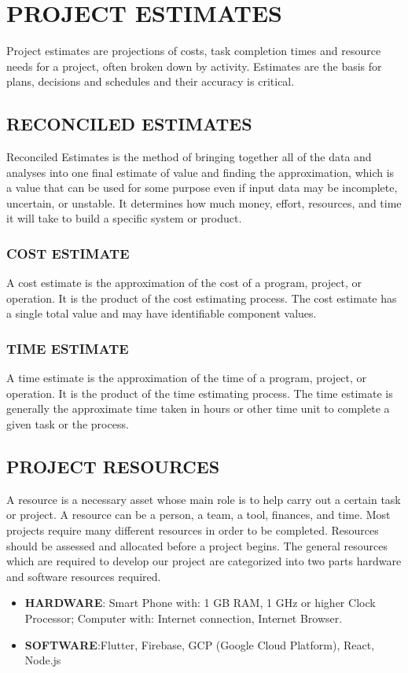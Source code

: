 \documentclass[12pt,a4paper]{report}
\begin{document}
\section{PROJECT ESTIMATES}
Project estimates are projections of costs, task completion times and resource needs for a project, often broken down by activity. Estimates are the basis for plans, decisions and schedules and their accuracy is critical.
\subsection{RECONCILED ESTIMATES}
Reconciled Estimates is the method of bringing together all of the data and analyses into one final estimate of value and finding the approximation, which is a value that can be used for some purpose even if input data may be incomplete, uncertain, or unstable. It determines how much money, effort, resources, and time it will take to build a specific system or product. 
\subsubsection{COST ESTIMATE}
A cost estimate is the approximation of the cost of a program, project, or operation. It is the product of the cost estimating process. The cost estimate has a single total value and may have identifiable component values. 
\subsubsection{TIME ESTIMATE}
A time estimate is the approximation of the time of a program, project, or operation. It is the product of the time estimating process. The time estimate is generally the approximate time taken in hours or other time unit to complete a given task or the process. 
\subsection{PROJECT RESOURCES}
A resource is a necessary asset whose main role is to help carry out a certain task or project. A resource can be a person, a team, a tool, finances, and time. Most projects require many different resources in order to be completed. Resources should be assessed and allocated before a project begins. The general resources which are required to develop our project are categorized into two parts hardware and software resources required. 
\begin{itemize}
\item {\textbf{HARDWARE}:   Smart Phone with: 1 GB RAM, 1 GHz or higher Clock Processor; Computer with: Internet connection, Internet Browser.} 
\item{\textbf{SOFTWARE}:Flutter, Firebase, GCP (Google Cloud Platform), React, Node.js}
\end{itemize}
\end{document}
